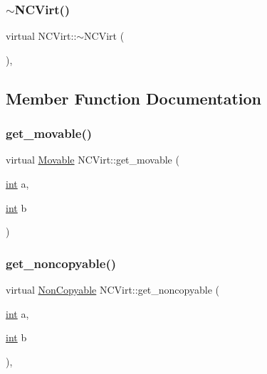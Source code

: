 \subsubsection{\texorpdfstring{$\sim$NCVirt()}{~NCVirt()}}
{\footnotesize\ttfamily virtual N\+C\+Virt\+::$\sim$\+N\+C\+Virt (\begin{DoxyParamCaption}{ }\end{DoxyParamCaption})\hspace{0.3cm}{\ttfamily [inline]}, {\ttfamily [virtual]}}



\subsection{Member Function Documentation}
\mbox{\label{class_n_c_virt_ab6bb0d2ff17908374b468304263ae3bd}} 
\subsubsection{\texorpdfstring{get\_movable()}{get\_movable()}}
{\footnotesize\ttfamily virtual \mbox{\hyperlink{class_movable}{Movable}} N\+C\+Virt\+::get\+\_\+movable (\begin{DoxyParamCaption}\item[{\mbox{\hyperlink{warnings_8h_a74f207b5aa4ba51c3a2ad59b219a423b}{int}}}]{a,  }\item[{\mbox{\hyperlink{warnings_8h_a74f207b5aa4ba51c3a2ad59b219a423b}{int}}}]{b }\end{DoxyParamCaption})\hspace{0.3cm}{\ttfamily [pure virtual]}}

\mbox{\label{class_n_c_virt_a3add36fcb2d3c6d1e388001594d2090b}} 
\subsubsection{\texorpdfstring{get\_noncopyable()}{get\_noncopyable()}}
{\footnotesize\ttfamily virtual \mbox{\hyperlink{class_non_copyable}{Non\+Copyable}} N\+C\+Virt\+::get\+\_\+noncopyable (\begin{DoxyParamCaption}\item[{\mbox{\hyperlink{warnings_8h_a74f207b5aa4ba51c3a2ad59b219a423b}{int}}}]{a,  }\item[{\mbox{\hyperlink{warnings_8h_a74f207b5aa4ba51c3a2ad59b219a423b}{int}}}]{b }\end{DoxyParamCaption})\hspace{0.3cm}{\ttfamily [inline]}, {\ttfamily [virtual]}}

